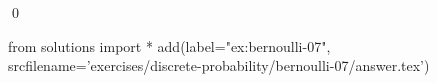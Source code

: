 
\begin{ex} 
  \label{ex:bernoulli-07}
  
  \qed
\end{ex} 
\begin{python0}
from solutions import *
add(label="ex:bernoulli-07",
    srcfilename='exercises/discrete-probability/bernoulli-07/answer.tex') 
\end{python0}
